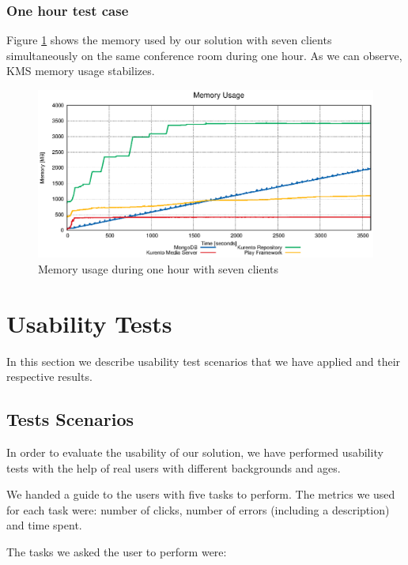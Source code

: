 \subsubsection{One hour test case}


   Figure \ref{fig:test_hour_mem} shows the memory used by our solution with seven clients simultaneously on the same conference room during one hour. As we can observe, \ac{KMS} memory usage stabilizes.


\begin{figure}
  \centering
  \includegraphics[width=\textwidth]{stats/test_hour_mem.eps}
  \caption{Memory usage during one hour with seven clients}
  \label{fig:test_hour_mem}
\end{figure}





\section {Usability Tests}
     In this section we describe usability test scenarios that we have applied and their respective results.


    \subsection{Tests Scenarios}

      In order to evaluate the usability of our solution, we have performed usability tests with the help of real users with different backgrounds and ages.

      We handed a guide to the users with five tasks to perform. The metrics we used for each task were: number of clicks, number of errors (including a description) and time spent. 

      The tasks we asked the user to perform were:

